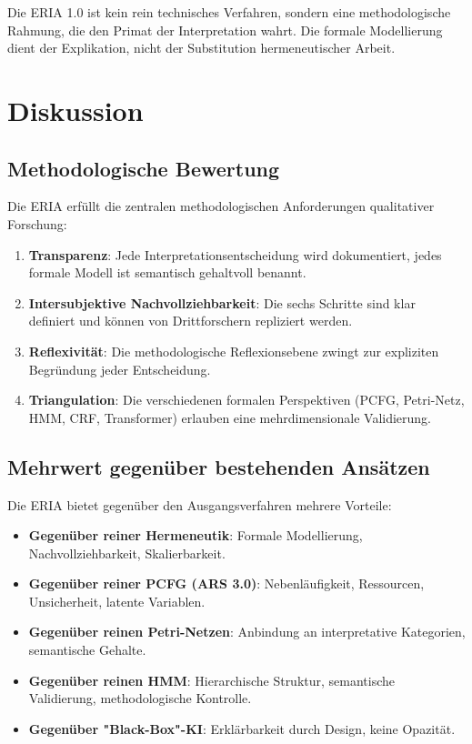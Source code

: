 \documentclass[12pt,a4paper]{article}
\begin{document}
Die ERIA 1.0 ist kein rein technisches Verfahren, sondern eine methodologische 
Rahmung, die den Primat der Interpretation wahrt. Die formale Modellierung dient 
der Explikation, nicht der Substitution hermeneutischer Arbeit.

\section{Diskussion}

\subsection{Methodologische Bewertung}

Die ERIA erfüllt die zentralen methodologischen Anforderungen qualitativer 
Forschung:

\begin{enumerate}
    \item \textbf{Transparenz}: Jede Interpretationsentscheidung wird dokumentiert, 
    jedes formale Modell ist semantisch gehaltvoll benannt.
    
    \item \textbf{Intersubjektive Nachvollziehbarkeit}: Die sechs Schritte sind 
    klar definiert und können von Drittforschern repliziert werden.
    
    \item \textbf{Reflexivität}: Die methodologische Reflexionsebene zwingt zur 
    expliziten Begründung jeder Entscheidung.
    
    \item \textbf{Triangulation}: Die verschiedenen formalen Perspektiven (PCFG, 
    Petri-Netz, HMM, CRF, Transformer) erlauben eine mehrdimensionale Validierung.
\end{enumerate}

\subsection{Mehrwert gegenüber bestehenden Ansätzen}

Die ERIA bietet gegenüber den Ausgangsverfahren mehrere Vorteile:

\begin{itemize}
    \item \textbf{Gegenüber reiner Hermeneutik}: Formale Modellierung, 
    Nachvollziehbarkeit, Skalierbarkeit.
    \item \textbf{Gegenüber reiner PCFG (ARS 3.0)}: Nebenläufigkeit, Ressourcen, 
    Unsicherheit, latente Variablen.
    \item \textbf{Gegenüber reinen Petri-Netzen}: Anbindung an interpretative 
    Kategorien, semantische Gehalte.
    \item \textbf{Gegenüber reinen HMM}: Hierarchische Struktur, semantische 
    Validierung, methodologische Kontrolle.
    \item \textbf{Gegenüber "Black-Box"-KI}: Erklärbarkeit durch Design, keine Opazität.
\end{itemize}
\end{document}
